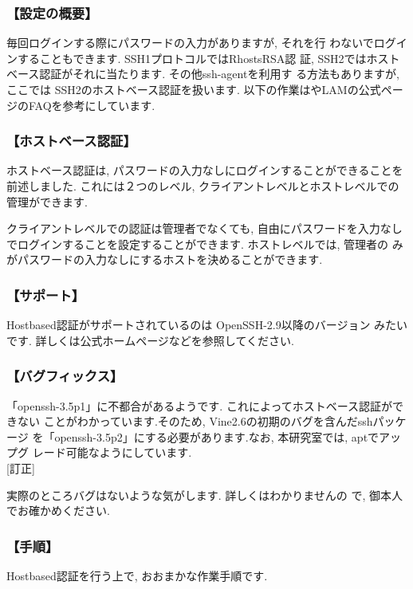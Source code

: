 \documentclass[a4paper,titlepage]{jreport}
\begin{document}
\subsubsection{【設定の概要】}

毎回ログインする際にパスワードの入力がありますが, それを行
わないでログインすることもできます.  SSH1プロトコルではRhostsRSA認
証, SSH2ではホストベース認証がそれに当たります. その他ssh-agentを利用す
る方法もありますが, ここでは SSH2のホストベース認証を扱います.
以下の作業は\cite{ssh}やLAMの公式ページのFAQを参考にしています.

\subsubsection{【ホストベース認証】}
ホストベース認証は, パスワードの入力なしにログインすることができることを
前述しました. これには２つのレベル, クライアントレベルとホストレベルでの
管理ができます.

クライアントレベルでの認証は管理者でなくても, 自由にパスワードを入力なし
でログインすることを設定することができます.   ホストレベルでは, 管理者の
みがパスワードの入力なしにするホストを決めることができます. 

\subsubsection{【サポート】}
Hostbased認証がサポートされているのは OpenSSH-2.9以降のバージョン
みたいです. 詳しくは公式ホームページなどを参照してください.

\subsubsection{【バグフィックス】}
「openssh-3.5p1」に不都合があるようです. これによってホストベース認証ができない
ことがわかっています.そのため, Vine2.6の初期のバグを含んだsshパッケージ
を「openssh-3.5p2」にする必要があります.なお, 本研究室では, aptでアップグ
レード可能なようにしています.\\

[訂正]

実際のところバグはないような気がします.  詳しくはわかりませんの
で, 御本人でお確かめください.

\subsubsection{【手順】}

Hostbased認証を行う上で, おおまかな作業手順です.
\end{document}
